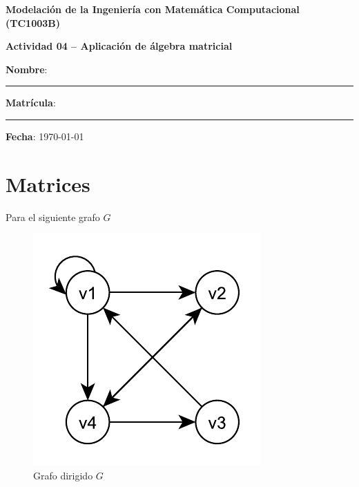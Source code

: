 \documentclass[spanish, 10pt]{article}
\begin{document}
\begin{center}
	{\Large \textbf{Modelación de la Ingeniería con Matemática Computacional (TC1003B)}}
	
	\bigskip
	{\large \textbf{Actividad 04 -- Aplicación de álgebra matricial}}
\end{center}

\bigskip
{\large \textbf{Nombre}: \rule{13.7 cm}{0.4mm}}



\bigskip
{\large \textbf{Matrícula}: \rule{5 cm}{0.4mm}} \hfill {\large \textbf{Fecha}: \today}

\bigskip


\section{Matrices}

Para el siguiente grafo $G$

\begin{figure}[htbp]
    \centering
    \includegraphics{digraph02.pdf}
    \caption{Grafo dirigido $G$}
    \label{fig:digraph}
\end{figure}
\end{document}
